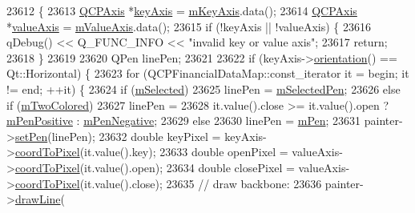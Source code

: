 \begin{DoxyCode}
23612                                                   \{
23613   \hyperlink{class_q_c_p_axis}{QCPAxis} *\hyperlink{class_q_c_p_abstract_plottable_a72c7a09c22963f2c943f07112b311103}{keyAxis} = \hyperlink{class_q_c_p_abstract_plottable_a426f42e254d0f8ce5436a868c61a6827}{mKeyAxis}.data();
23614   \hyperlink{class_q_c_p_axis}{QCPAxis} *\hyperlink{class_q_c_p_abstract_plottable_a3106f9d34d330a6097a8ec5905e5b519}{valueAxis} = \hyperlink{class_q_c_p_abstract_plottable_a2901452ca4aea911a1827717934a4bda}{mValueAxis}.data();
23615   \textcolor{keywordflow}{if} (!keyAxis || !valueAxis) \{
23616     qDebug() << Q\_FUNC\_INFO << \textcolor{stringliteral}{"invalid key or value axis"};
23617     \textcolor{keywordflow}{return};
23618   \}
23619 
23620   QPen linePen;
23621 
23622   \textcolor{keywordflow}{if} (keyAxis->\hyperlink{class_q_c_p_axis_a57483f2f60145ddc9e63f3af53959265}{orientation}() == Qt::Horizontal) \{
23623     \textcolor{keywordflow}{for} (QCPFinancialDataMap::const\_iterator it = begin; it != end; ++it) \{
23624       \textcolor{keywordflow}{if} (\hyperlink{class_q_c_p_abstract_plottable_a43f68a0603e9bcd016bdfa6d9d5c41c9}{mSelected})
23625         linePen = \hyperlink{class_q_c_p_abstract_plottable_a10619472f5d5e10e9519a599f1cf5576}{mSelectedPen};
23626       \textcolor{keywordflow}{else} \textcolor{keywordflow}{if} (\hyperlink{class_q_c_p_financial_a6afe919190b884d9bac026cefcc8c0a8}{mTwoColored})
23627         linePen =
23628             it.value().close >= it.value().open ? \hyperlink{class_q_c_p_financial_aa6599186f417ba615caebb3f6c762bd8}{mPenPositive} : 
      \hyperlink{class_q_c_p_financial_a263fbfefde2cc19c8d4024a8319c2bbb}{mPenNegative};
23629       \textcolor{keywordflow}{else}
23630         linePen = \hyperlink{class_q_c_p_abstract_plottable_a67bc0622fd1b9fa14e54c14922dcec66}{mPen};
23631       painter->\hyperlink{class_q_c_p_painter_af9c7a4cd1791403901f8c5b82a150195}{setPen}(linePen);
23632       \textcolor{keywordtype}{double} keyPixel = keyAxis->\hyperlink{class_q_c_p_axis_a985ae693b842fb0422b4390fe36d299a}{coordToPixel}(it.value().key);
23633       \textcolor{keywordtype}{double} openPixel = valueAxis->\hyperlink{class_q_c_p_axis_a985ae693b842fb0422b4390fe36d299a}{coordToPixel}(it.value().open);
23634       \textcolor{keywordtype}{double} closePixel = valueAxis->\hyperlink{class_q_c_p_axis_a985ae693b842fb0422b4390fe36d299a}{coordToPixel}(it.value().close);
23635       \textcolor{comment}{// draw backbone:}
23636       painter->\hyperlink{class_q_c_p_painter_a0b4b1b9bd495e182c731774dc800e6e0}{drawLine}(

\end{DoxyCode}
